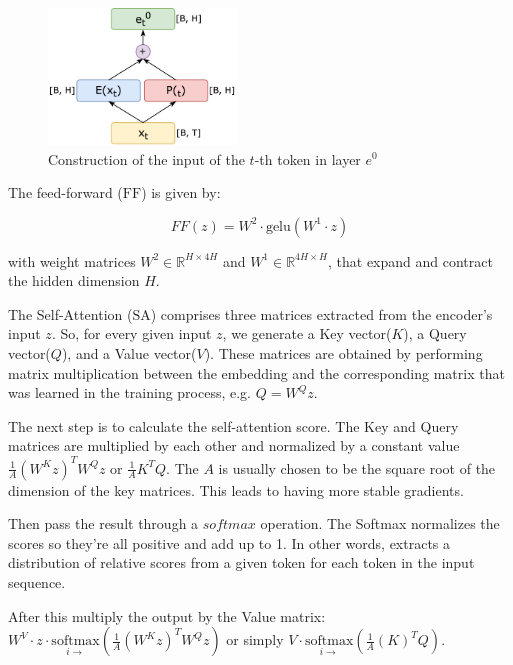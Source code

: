 \begin{figure}[h]
    \centering
    \includegraphics[width=5cm]{pages/imgs/e0.png}
    \caption{Construction of the input of the $t$-th token in layer $e^0$}
    \label{fig:e0}
\end{figure}



\noindent The feed-forward ($\mathrm{FF}$) is given by:

\begin{equation}
FF(z) = W^2\cdot \mathrm{gelu}(W^1 \cdot z)
\end{equation}

\noindent with weight matrices $W^2 \in \mathbb{R}^{H \times 4H}$ and $W^1 \in \mathbb{R}^{4H \times H}$, that expand and contract the hidden dimension $H$.

The Self-Attention ($\mathrm{SA}$) comprises three matrices extracted from the encoder’s input $z$. So, for every given input $z$, we generate a Key vector($K$), a Query vector($Q$), and a Value vector($V$). These matrices are obtained by performing matrix multiplication between the embedding and the corresponding matrix that was learned in the training process, e.g. $Q = W^Q z$.

The next step is to calculate the self-attention score. The Key and Query matrices are multiplied by each other and normalized by a constant value $\frac{1}{A} \left(W^K z\right)^T W^Q z$ or $\frac{1}{A} K^T Q$. The $A$ is usually chosen to be the square root of the dimension of the key matrices. This leads to having more stable gradients.

\noindent Then pass the result through a $softmax$ operation. The Softmax normalizes the scores so they’re all positive and add up to 1. In other words, extracts a distribution of relative scores from a given token for each token in the input sequence.

\noindent After this multiply the output by the Value matrix: $W^V \cdot z \cdot \underset{i \rightarrow}{\mathrm{softmax}}\left( \frac{1}{A} \left(W^K z\right)^T W^Q z \right)$ or simply $V \cdot \underset{i \rightarrow}{\mathrm{softmax}}\left( \frac{1}{A} \left(K \right)^T Q \right)$.


